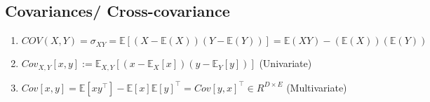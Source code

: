\subsection{Covariances/ Cross-covariance \cite{ism-1}} \label{Multivariate Distributions: Covariances/ Cross-covariance}

\begin{enumerate}
    \item $
        COV(X, Y) 
        = \sigma_{XY} 
        = \mathbb{E}[(X - \mathbb{E}(X))(Y - \mathbb{E}(Y))] 
        = \mathbb{E}(XY) - (\mathbb{E}(X))(\mathbb{E}(Y))
    $ \hfill \cite{ism-1}

    \item $
        Cov_{X,Y}[x, y] 
        := \mathbb{E}_{X,Y}[(x - \mathbb{E}_X[x])(y - \mathbb{E}_Y[y])]
    $ \hfill (Univariate) \cite{mfml-1}

    \item $
        Cov[x, y] 
        = \mathbb{E}[xy^\top] - \mathbb{E}[x]\mathbb{E}[y]^\top 
        = Cov[y, x]^\top 
        \in R^{D\times E}
    $ \hfill (Multivariate) \cite{mfml-1}

    

\end{enumerate}

